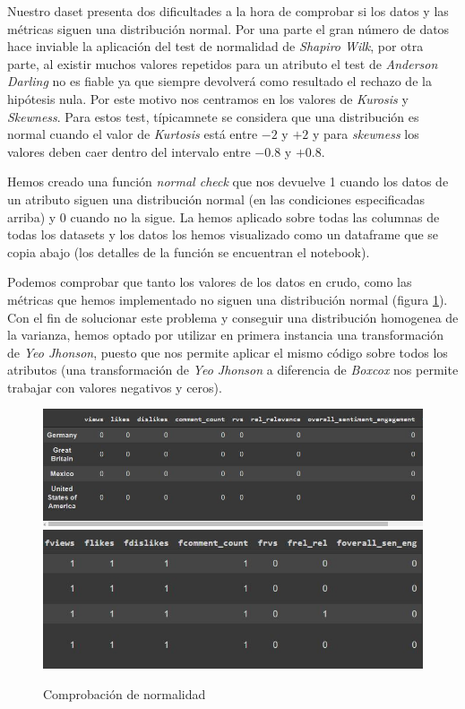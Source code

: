 \documentclass[a4paper,12pt]{article}
\begin{document}
Nuestro daset presenta dos dificultades a la hora de comprobar si los datos y las m\'etricas siguen una distribuci\'on normal. Por una parte el gran n\'umero de datos hace inviable la aplicaci\'on del test de normalidad de {\itshape  Shapiro Wilk}, por otra parte, al existir muchos valores repetidos para un atributo el test de {\itshape Anderson Darling} no es fiable ya que siempre devolver\'a como resultado el rechazo de la hip\'otesis nula. Por este motivo nos centramos en los valores de {\itshape Kurosis} y {\itshape Skewness}. Para estos test, t\'ipicamnete se considera que una distribuci\'on es normal cuando el valor de {\itshape Kurtosis} est\'a entre $-2$ y $+2$ y para {\itshape skewness} los valores deben caer dentro del intervalo entre $-0.8$ y $+0.8$.

Hemos creado una funci\'on {\itshape normal check} que nos devuelve 1 cuando los datos de un atributo siguen una distribuci\'on normal (en las condiciones especificadas arriba) y 0 cuando no la sigue. La hemos aplicado sobre todas las columnas de todas los datasets y los datos los hemos visualizado como un dataframe que se copia abajo (los detalles de la funci\'on se encuentran el notebook).

Podemos comprobar que tanto los valores de los datos en crudo, como las m\'etricas que hemos implementado no siguen una distribuci\'on normal (figura \ref{fig:norm_1}). Con el fin de solucionar este problema y conseguir una distribuci\'on homogenea de la varianza, hemos optado por utilizar en primera instancia una transformaci\'on de {\itshape Yeo Jhonson}, puesto que nos permite aplicar el mismo c\'odigo sobre todos los atributos (una transformaci\'on de {\itshape Yeo Jhonson} a diferencia de {\itshape Boxcox} nos permite trabajar con valores negativos y ceros).




\begin{figure}
\centering
\includegraphics[width=12cm]{dataframe_1.JPG}
\includegraphics[width=12cm]{dataframe_2.JPG}
\caption{Comprobaci\'on de normalidad}
\label{fig:norm_1}
\end{figure}
 
\end{document}
